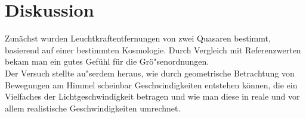 \documentclass[12pt]{article}
\begin{document}
\section{Diskussion}

Zun\"{a}chst wurden Leuchtkraftentfernungen von zwei Quasaren bestimmt, basierend auf einer bestimmten Kosmologie. Durch Vergleich mit Referenzwerten bekam man ein gutes Gef\"{u}hl f\"{u}r die Gr\"{o}"senordnungen. \\
Der Versuch stellte au"serdem heraus, wie durch geometrische Betrachtung von Bewegungen am Himmel scheinbar Geschwindigkeiten entstehen k\"{o}nnen, die ein Vielfaches der Lichtgeschwindigkeit betragen und wie man diese in reale und vor allem realistische Geschwindigkeiten umrechnet. 
\end{document}
